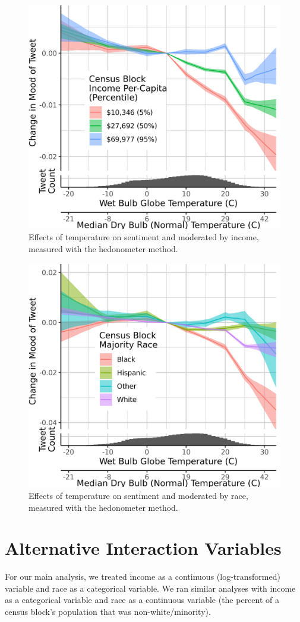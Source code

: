 \documentclass{article}
\begin{document}
\begin{figure}[H]
  \centering
  \includegraphics[width=0.6\linewidth]{../res/hedono-wbgt-income.png}
  \caption{Effects of temperature on sentiment and moderated by income, measured with the hedonometer method.}
\end{figure}

\begin{figure}[H]
  \centering
  \includegraphics[width=0.6\linewidth]{../res/hedono-wbgt-race_q.png}
  \caption{Effects of temperature on sentiment and moderated by race, measured with the hedonometer method.}
\end{figure}

\section{Alternative Interaction Variables}
For our main analysis, we treated income as a continuous (log-transformed) variable and race as a categorical variable.  We ran similar analyses with income as a categorical variable and race as a continuous variable (the percent of a census block's population that was non-white/minority).
\end{document}
